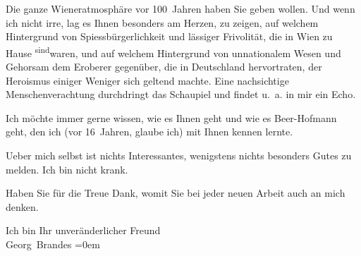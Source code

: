 \pstart
           Die ganze Wieneratmosphäre vor 100 Jahren haben
               Sie geben wollen. Und wenn ich nicht irre, lag es Ihnen besonders am Herzen, zu
               zeigen, auf welchem Hintergrund von Spiessbürgerlichkeit und lässiger Frivolität, die
               in Wien zu Hause \substVorne{}\textsuperscript{sind}\substDazwischen{}waren\substHinten{}, und auf welchem Hintergrund von unnationalem Wesen und Gehorsam dem
               Eroberer gegenüber, die in Deutschland
               hervortraten, der Heroismus einiger Weniger sich geltend machte. Eine nachsichtige
               Menschenverachtung durchdringt das Schaupiel und findet u. a. in mir ein Echo.\pend
           
\pstart
           Ich möchte immer gerne wissen, wie es {\pb}Ihnen geht und wie es Beer-Hofmann geht, den ich (vor 16 Jahren,
               glaube ich) mit Ihnen kennen lernte.\pend
           
\pstart
           Ueber mich selbst ist nichts Interessantes, wenigstens nichts besonders Gutes zu
               melden. Ich bin nicht krank.\pend
           
\pstart
           Haben Sie für die Treue Dank, womit Sie bei jeder neuen Arbeit auch an mich
               denken.\pend
           
\pstart
           Ich bin Ihr unveränderlicher Freund{\\[\baselineskip]}\spacefill\mbox{Georg Brandes}\pend
           \leftskip=0em{}\endnumbering{}  \newcommand{\dateiname}{L01991}\newcommand{\titel}{Georg Brandes an Arthur Schnitzler, 18. 12. 1910}\newcommand{\editorInnen}{Martin Anton Müller und Gerd-Hermann Susen}
